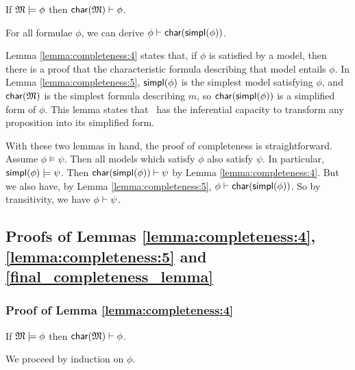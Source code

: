 

\begin{lemma}\label{lemma:completeness:4}
If $\frak{M} \models \phi$ then $\mathsf{char}(\frak{M}) \vdash \phi$.
\end{lemma}

\begin{lemma}\label{lemma:completeness:5}
For all formulae $\phi$, we can derive $\phi \vdash \mathsf{char}(\mathsf{simpl}(\phi))$.
\end{lemma}

\NI Lemma \ref{lemma:completeness:4} states that, if $\phi$ is
satisfied by a model, then there is a proof that the characteristic
formula describing that model entails $\phi$.  In Lemma
\ref{lemma:completeness:5}, $\mathsf{simpl}(\phi)$ is the simplest
model satisfying $\phi$, and $\mathsf{char}(\frak{M})$ is the simplest formula
describing $m$, so $\mathsf{char}(\mathsf{simpl}(\phi))$ is a simplified form of
$\phi$. This lemma states that \cathoristic\ has the inferential capacity to
transform any proposition into its simplified form.

With these two lemmas in hand, the proof of completeness is
straightforward.  Assume $\phi \models \psi$.  Then all models which satisfy
$\phi$ also satisfy $\psi$.  In particular, $\mathsf{simpl}(\phi) \models \psi$.  Then
$\mathsf{char}(\mathsf{simpl}(\phi)) \vdash \psi$ by Lemma \ref{lemma:completeness:4}.  But we
also have, by Lemma \ref{lemma:completeness:5}, $\phi \vdash
\mathsf{char}(\mathsf{simpl}(\phi)) $.  So by transitivity, we have $\phi \vdash \psi$.  

\subsection{Proofs of Lemmas \ref{lemma:completeness:4}, \ref{lemma:completeness:5} and \ref{final_completeness_lemma}}

\subsubsection{Proof of Lemma \ref{lemma:completeness:4}}
\label{prooflemma4}
If $\frak{M}\models \phi$ then $\mathsf{char}(\frak{M}) \vdash \phi$.

\NI We proceed by induction on $\phi$.

